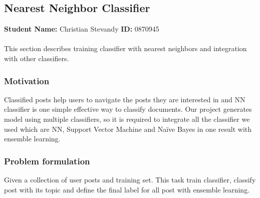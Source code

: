 \subsection{Nearest Neighbor Classifier}
	\textbf{Student Name: }Christian Stevandy \textbf{ID:} 0870945\\\\
	This section describes training classifier with nearest neighbors and integration with other classifiers.
\subsubsection*{Motivation}
	Classified posts help users to navigate the posts they are interested in and NN classifier is one simple effective way to classify documents. Our project generates model using multiple classifiers, so it is required to integrate all the classifier we used which are NN, Support Vector Machine and Naïve Bayes in one result with ensemble learning.
\subsubsection*{Problem formulation}
	Given a collection of user posts and training set. This task train classifier, classify post with its topic and define the final label for all post with ensemble learning.
